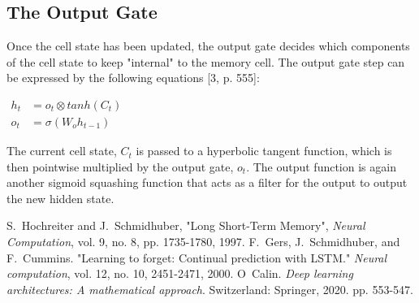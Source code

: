 \documentclass[journal]{IEEEtran}
\begin{document}
\subsection{The Output Gate}
Once the cell state has been updated, the output gate decides which components of the
cell state to keep "internal" to the memory cell.
The output gate step can be expressed by the following equations [3, p. 555]:

$\begin{array}{ll}
h_{t} & = o_{t}\otimes tanh(C_{t}) \\
o_{t} & = \sigma(W_{o}h_{t-1})
\end{array}$

The current cell state, $C_{t}$ is passed to a hyperbolic tangent function, which is then pointwise multiplied
by the output gate, $o_{t}$. The output function is again another sigmoid squashing function that
acts as a filter for the output to output the new hidden state.

\ifCLASSOPTIONcaptionsoff
  \newpage
\fi

\begin{thebibliography}{1}

S.~Hochreiter and J.~Schmidhuber, "Long Short-Term Memory", \emph{Neural Computation}, vol. 9, no. 8, pp. 1735-1780, 1997.
F.~Gers, J.~Schmidhuber, and F.~Cummins. "Learning to forget: Continual prediction with LSTM." \emph{Neural computation}, vol. 12, no. 10, 2451-2471, 2000.
O~Calin. \emph{Deep learning architectures: A mathematical approach}. Switzerland: Springer, 2020. pp. 553-547.

\end{thebibliography}
\end{document}
